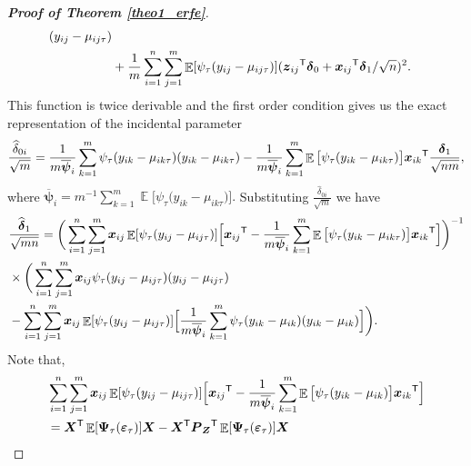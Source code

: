 \documentclass[15pt,a4paper]{article}
\DeclareMathOperator{\E}{\mathbb{E}}
\newcommand{\transpose}{{}^{\text{\sffamily T}}}
\begin{document}
\begin{proof}[\textbf{Proof of Theorem \ref{theo1_erfe}}]
\begin{equation*}
\begin{split}
        (y_{ij}-\mu_{ij\tau})\\
        & +\frac{1}{m}\sum_{i=1}^{n}\sum_{j=1}^{m}\E[\psi_\tau(y_{ij}-\mu_{ij\tau})]
   (\boldsymbol{z}_{ij}\transpose\boldsymbol{\delta}_0+\boldsymbol{x}_{ij} \transpose\boldsymbol{\delta}_1/\sqrt{n})^2.
\end{split}
\end{equation*}
This function is twice derivable and the first order condition gives us the exact representation of the incidental parameter
\begin{equation*}
   \frac{\widehat{\delta}_{0i}}{\sqrt{m}}=\frac{1}{m\overline{\boldsymbol{\psi}}_i}\sum_{k=1}^{m}\psi_{\tau}(y_{ik}-\mu_{ik\tau})(y_{ik}-\mu_{ik\tau})-\frac{1}{m\overline{\boldsymbol{\psi}}_i}
    \sum_{k=1}^{m}\E\big[\psi_{\tau}(y_{ik}-\mu_{ik\tau})\big]\boldsymbol{x}_{ik}\transpose\frac{\boldsymbol{\delta}_1}{\sqrt{nm}},
\end{equation*}
where $\overline{\boldsymbol{\psi}}_i=m^{-1}\sum_{k=1}^{m} \E\Big[\psi_{\tau}\big(y_{ik}-\mu_{ik\tau}\big)\Big].$
Substituting $\frac{\widehat{\delta}_{0i}}{\sqrt{m}}$ we have
\begin{equation*}
\begin{split}
   {}&\frac{\widehat{\boldsymbol{\delta}}_{1}}{\sqrt{mn}}=\bigg(\sum_{i=1}^{n}\sum_{j=1}^{m}\boldsymbol{x}_{ij}\E[\psi_\tau(y_{ij}-\mu_{ij\tau})]\Big[\boldsymbol{x}_{ij}\transpose-\frac{1}{m
   \overline{\boldsymbol{\psi}}_i}
   \sum_{k=1}^{m}\E\big[\psi_{\tau}(y_{ik}-\mu_{ik\tau})\big]\boldsymbol{x}_{ik}\transpose\Big]\bigg)^{-1}\\
   {}&\times \bigg(\sum_{i=1}^{n}\sum_{j=1}^{m}\boldsymbol{x}_{ij}\psi_\tau(y_{ij}-\mu_{ij\tau})
   (y_{ij}-\mu_{ij\tau})\\
   {}& -\sum_{i=1}^{n}\sum_{j=1}^{m}\boldsymbol{x}_{ij}\E[\psi_\tau(y_{ij}-
   \mu_{ij\tau})]\Big[\frac{1}{m\overline{\boldsymbol{\psi}}_i}\sum_{k=1}^{m}
   \psi_{\tau}(y_{ik}-\mu_{ik})(y_{ik}-\mu_{ik})\Big]\bigg).
\end{split}
\end{equation*}
Note that,
\begin{equation*}
\begin{split}
   {}& \sum_{i=1}^{n}\sum_{j=1}^{m}\boldsymbol{x}_{ij}\E[\psi_\tau(y_{ij}-\mu_{ij\tau})]\Big[\boldsymbol{x}_{ij}\transpose-\frac{1}{m\overline{\boldsymbol{\psi}}_i}  \sum_{k=1}^{m}\E\big[\psi_{\tau}(y_{ik}-\mu_{ik})\big]\boldsymbol{x}_{ik}\transpose\Big]\\
   {}&=\boldsymbol{X}\transpose\E[\boldsymbol{\Psi}_\tau(\boldsymbol{\varepsilon}_{\tau})]\boldsymbol{X}-\boldsymbol{X}\transpose\boldsymbol{P}_{\boldsymbol{Z}}\transpose\E[\boldsymbol{\Psi}_\tau(\boldsymbol{\varepsilon}_{\tau})]\boldsymbol{X}\\

\end{split}
\end{equation*}
\end{proof}
\end{document}
